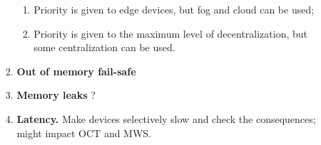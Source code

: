\begin{enumerate}
\begin{enumerate}
\begin{enumerate}
\begin{enumerate}
                            \item Priority is given to edge devices, but fog and cloud can be used;
                            \item Priority is given to the maximum level of decentralization, but some centralization can be used.
                        \end{enumerate}
                    \item \textbf{Out of memory fail-safe}
                    \item \textbf{Memory leaks} ?
                    \item \textbf{Latency.} Make devices selectively slow and check the consequences; might impact OCT and MWS.
                \end{enumerate}
        \end{enumerate}
\end{enumerate}





    
    



